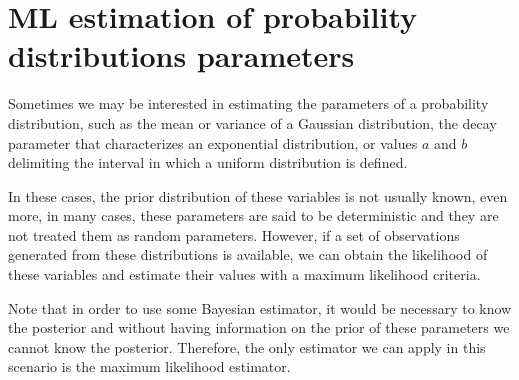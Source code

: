 \section{ML estimation of probability distributions parameters}

Sometimes we may be interested in estimating the parameters of a probability distribution, such as the mean or variance of a Gaussian distribution, the decay parameter that characterizes an exponential distribution, or values $a$ and $b$ delimiting the interval in which a uniform distribution is defined.

In these cases, the prior distribution of these variables is not usually known, even more, in many cases, these parameters are said to be deterministic and they are not treated them as random parameters. However, if a set of observations generated from these distributions is available, we can obtain the likelihood of these variables and estimate their values with a maximum likelihood criteria.

Note that in order to use some Bayesian estimator, it would be necessary to know the posterior and without having information on the prior of these parameters we cannot know the posterior. Therefore, the only estimator we can apply in this scenario is the maximum likelihood estimator.


